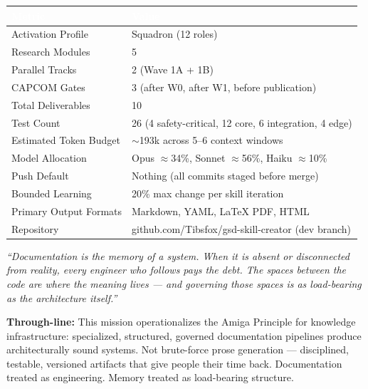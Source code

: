 \documentclass[11pt,letterpaper]{article}
\newcommand{\tableheader}[1]{\textbf{\sffamily\textcolor{white}{#1}}}
\begin{document}
\begin{center}
\begin{tabularx}{\textwidth}{L{5cm}X}
\toprule
{}
\tableheader{Metric} & \tableheader{Value} \\
\midrule
Activation Profile & Squadron (12 roles) \\
Research Modules & 5 \\
Parallel Tracks & 2 (Wave 1A + 1B) \\
CAPCOM Gates & 3 (after W0, after W1, before publication) \\
Total Deliverables & 10 \\
Test Count & 26 (4 safety-critical, 12 core, 6 integration, 4 edge) \\
Estimated Token Budget & $\sim$193k across 5--6 context windows \\
Model Allocation & Opus $\approx$34\%, Sonnet $\approx$56\%, Haiku $\approx$10\% \\
Push Default & Nothing (all commits staged before merge) \\
Bounded Learning & 20\% max change per skill iteration \\
Primary Output Formats & Markdown, YAML, LaTeX PDF, HTML \\
Repository & github.com/Tibsfox/gsd-skill-creator (dev branch) \\
\bottomrule
\end{tabularx}
\end{center}

\vspace{2em}

\begin{quotebox}
\textit{``Documentation is the memory of a system. When it is absent or disconnected from reality, every engineer who follows pays the debt. The spaces between the code are where the meaning lives --- and governing those spaces is as load-bearing as the architecture itself.''}

\vspace{0.8em}
\noindent\textbf{Through-line:} This mission operationalizes the Amiga Principle for knowledge infrastructure: specialized, structured, governed documentation pipelines produce architecturally sound systems. Not brute-force prose generation --- disciplined, testable, versioned artifacts that give people their time back. Documentation treated as engineering. Memory treated as load-bearing structure.
\end{quotebox}
\end{document}
